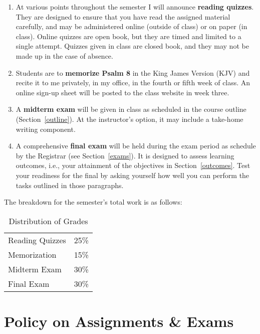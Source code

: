 \documentclass[titlepage]{article}
\newcommand\policy{../policy}
\begin{document}
\begin{enumerate}

	\item At various points throughout the semester I will announce
	\textbf{reading quizzes}. They are designed to ensure that you have
	read the assigned material carefully, and may be administered online
	(outside of class) or on paper (in class). Online quizzes are open
	book, but they are timed and limited to a single attempt. Quizzes
	given in class are closed book, and they may not be made up in the
	case of absence.

	\item Students are to \textbf{memorize Psalm 8} in the King James
	Version (KJV) and recite it to me privately, in my office, in the
	fourth or fifth week of class. An online sign-up sheet will be
	posted to the class website in week three.

	\item A \textbf{midterm exam} will be given in class as scheduled in
	the course outline (Section~\ref{outline}). At the instructor's
	option, it may include a take-home writing component.

	\item A comprehensive \textbf{final exam} will be held during the
	exam period as schedule by the Registrar (see Section~\ref{exams}).
	It is designed to assess learning outcomes, i.e., your attainment of
	the objectives in Section~\ref{outcomes}. Test your readiness for
	the final by asking yourself how well you can perform the tasks
	outlined in those paragraphs.

\end{enumerate}

The breakdown for the semester's total work is as follows:

\begin{table}[htbp]
  \centering
  {\lining
  \begin{tabular}{lr}
    \toprule
    Reading Quizzes & 25\% \\
    Memorization    & 15\% \\
    Midterm Exam    & 30\% \\
    Final Exam      & 30\% \\
    \bottomrule
  \end{tabular}}
  \caption{Distribution of Grades}
  \label{distribution}
\end{table}



\section{Policy on Assignments \& Exams}
\label{policy}
\end{document}
